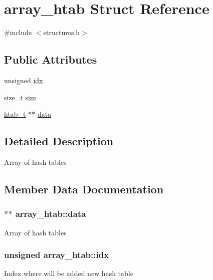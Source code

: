 \hypertarget{structarray__htab}{}\section{array\+\_\+htab Struct Reference}
\label{structarray__htab}


{\ttfamily \#include $<$structures.\+h$>$}

\subsection*{Public Attributes}
\begin{DoxyCompactItemize}
\item 
unsigned \hyperlink{structarray__htab_afd9eaf3820cafa19b1605f4779707121}{idx}
\item 
size\+\_\+t \hyperlink{structarray__htab_a63abd88a74d355292833e33b5a6b1a72}{size}
\item 
\hyperlink{structhtab__t}{htab\+\_\+t} $\ast$$\ast$ \hyperlink{structarray__htab_a001618dfa51bc6f8099502658c152a1a}{data}
\end{DoxyCompactItemize}


\subsection{Detailed Description}
Array of hash tables 

\subsection{Member Data Documentation}
\hypertarget{structarray__htab_a001618dfa51bc6f8099502658c152a1a}{}
\subsubsection[{data}]{$\ast$$\ast$ array\+\_\+htab\+::data}\label{structarray__htab_a001618dfa51bc6f8099502658c152a1a}
Array of hash tables \hypertarget{structarray__htab_afd9eaf3820cafa19b1605f4779707121}{}
\subsubsection[{idx}]{\setlength{\rightskip}{0pt plus 5cm}unsigned array\+\_\+htab\+::idx}\label{structarray__htab_afd9eaf3820cafa19b1605f4779707121}
Index where will be added new hash table \hypertarget{structarray__htab_a63abd88a74d355292833e33b5a6b1a72}{}
